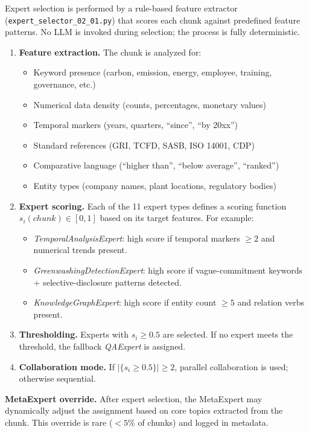 Expert selection is performed by a rule-based feature extractor (\texttt{expert\_selector\_02\_01.py}) that scores each chunk against predefined feature patterns. No LLM is invoked during selection; the process is fully deterministic.

\begin{enumerate}[noitemsep]
    \item \textbf{Feature extraction.} The chunk is analyzed for:
    \begin{itemize}[noitemsep]
        \item Keyword presence (carbon, emission, energy, employee, training, governance, etc.)
        \item Numerical data density (counts, percentages, monetary values)
        \item Temporal markers (years, quarters, ``since'', ``by 20xx'')
        \item Standard references (GRI, TCFD, SASB, ISO 14001, CDP)
        \item Comparative language (``higher than'', ``below average'', ``ranked'')
        \item Entity types (company names, plant locations, regulatory bodies)
    \end{itemize}
    
    \item \textbf{Expert scoring.} Each of the 11 expert types defines a scoring function $s_i(chunk) \in [0,1]$ based on its target features. For example:
    \begin{itemize}[noitemsep]
        \item \textit{TemporalAnalysisExpert}: high score if temporal markers $\geq 2$ and numerical trends present.
        \item \textit{GreenwashingDetectionExpert}: high score if vague-commitment keywords + selective-disclosure patterns detected.
        \item \textit{KnowledgeGraphExpert}: high score if entity count $\geq 5$ and relation verbs present.
    \end{itemize}
    
    \item \textbf{Thresholding.} Experts with $s_i \geq 0.5$ are selected. If no expert meets the threshold, the fallback \textit{QAExpert} is assigned.
    
    \item \textbf{Collaboration mode.} If $|\{s_i \geq 0.5\}| \geq 2$, parallel collaboration is used; otherwise sequential.
\end{enumerate}

\noindent\textbf{MetaExpert override.} After expert selection, the MetaExpert may dynamically adjust the assignment based on core topics extracted from the chunk. This override is rare ($<5\%$ of chunks) and logged in metadata.
